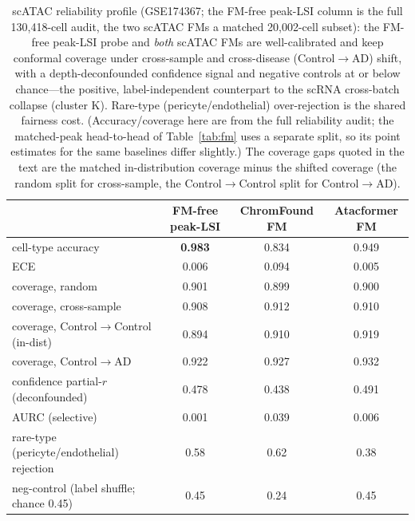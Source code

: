 \documentclass[fleqn,10pt,lineno]{wlpeerj}  %
\begin{document}
\begin{table}[!ht]\centering\footnotesize
\caption{scATAC reliability profile (GSE174367; the FM-free peak-LSI column is the full 130{,}418-cell audit, the two scATAC FMs a matched 20{,}002-cell subset): the FM-free peak-LSI probe and \emph{both} scATAC FMs are well-calibrated and keep conformal coverage under cross-sample and cross-disease (Control$\to$AD) shift, with a depth-deconfounded confidence signal and negative controls at or below chance---the positive, label-independent counterpart to the scRNA cross-batch collapse (cluster K). Rare-type (pericyte/endothelial) over-rejection is the shared fairness cost. (Accuracy/coverage here are from the full reliability audit; the matched-peak head-to-head of Table~\ref{tab:fm} uses a separate split, so its point estimates for the same baselines differ slightly.) The coverage gaps quoted in the text are the matched in-distribution coverage minus the shifted coverage (the random split for cross-sample, the Control$\to$Control split for Control$\to$AD).}
\label{tab:scatacrel}
\begin{tabular}{@{}lccc@{}}
\toprule
 & FM-free peak-LSI & ChromFound FM & Atacformer FM \\
\midrule
cell-type accuracy & \textbf{0.983} & 0.834 & 0.949 \\
ECE & 0.006 & 0.094 & 0.005 \\
coverage, random & 0.901 & 0.899 & 0.900 \\
coverage, cross-sample & 0.908 & 0.912 & 0.910 \\
coverage, Control$\to$Control (in-dist) & 0.894 & 0.910 & 0.919 \\
coverage, Control$\to$AD & 0.922 & 0.927 & 0.932 \\
confidence partial-$r$ (deconfounded) & 0.478 & 0.438 & 0.491 \\
AURC (selective) & 0.001 & 0.039 & 0.006 \\
rare-type (pericyte/endothelial) rejection & 0.58 & 0.62 & 0.38 \\
neg-control (label shuffle; chance 0.45) & 0.45 & 0.24 & 0.45 \\
\bottomrule
\end{tabular}
\end{table}
\end{document}
